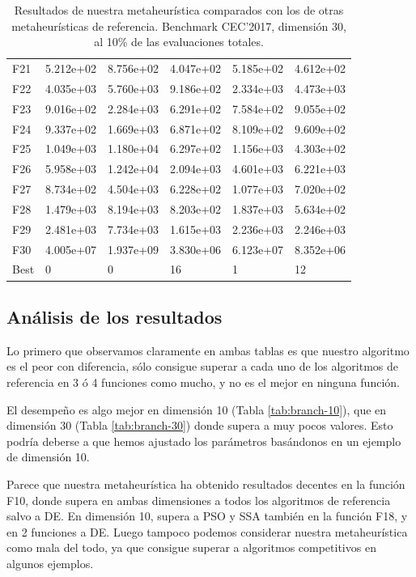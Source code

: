 \documentclass{article}
\begin{document}
\begin{table}[H]
\begin{tabular}{|l|lllll|}
		F21  &  5.212e+02 &  8.756e+02 &  4.047e+02 &  5.185e+02 &  4.612e+02 \\
		F22  &  4.035e+03 &  5.760e+03 &  9.186e+02 &  2.334e+03 &  4.473e+03 \\
		F23  &  9.016e+02 &  2.284e+03 &  6.291e+02 &  7.584e+02 &  9.055e+02 \\
		F24  &  9.337e+02 &  1.669e+03 &  6.871e+02 &  8.109e+02 &  9.609e+02 \\
		F25  &  1.049e+03 &  1.180e+04 &  6.297e+02 &  1.156e+03 &  4.303e+02 \\
		F26  &  5.958e+03 &  1.242e+04 &  2.094e+03 &  4.601e+03 &  6.221e+03 \\
		F27  &  8.734e+02 &  4.504e+03 &  6.228e+02 &  1.077e+03 &  7.020e+02 \\
		F28  &  1.479e+03 &  8.194e+03 &  8.203e+02 &  1.837e+03 &  5.634e+02 \\
		F29  &  2.481e+03 &  7.734e+03 &  1.615e+03 &  2.236e+03 &  2.246e+03 \\
		F30  &  4.005e+07 &  1.937e+09 &  3.830e+06 &  6.123e+07 &  8.352e+06 \\\hline
		Best &          0 &          0 &         16 &          1 &         12 \\
		\hline
	\end{tabular}
	\caption{Resultados de nuestra metaheurística comparados con los de otras metaheurísticas de referencia. Benchmark CEC'2017, dimensión 30, al 10\% de las evaluaciones totales.}
	\label{tab:10p-branch-30}
\end{table}


\subsection{Análisis de los resultados}

Lo primero que observamos claramente en ambas tablas es que nuestro algoritmo es el peor con diferencia, sólo consigue superar a
cada uno de los algoritmos de referencia en 3 ó 4 funciones como mucho, y no es el mejor en ninguna función. 

El desempeño es algo
mejor en dimensión 10 (Tabla \ref{tab:branch-10}), que en dimensión 30 (Tabla \ref{tab:branch-30}) donde supera a muy pocos valores.
Esto podría deberse a que hemos ajustado los parámetros basándonos en un ejemplo de dimensión 10.

Parece que nuestra metaheurística ha obtenido resultados decentes en la función F10, donde supera en ambas dimensiones a todos los
algoritmos de referencia salvo a DE. En dimensión 10, supera a PSO y SSA también en la función F18, y en 2 funciones a DE.
Luego tampoco podemos considerar nuestra metaheurística como mala del todo, ya que consigue superar a algoritmos competitivos en
algunos ejemplos.
\end{document}
